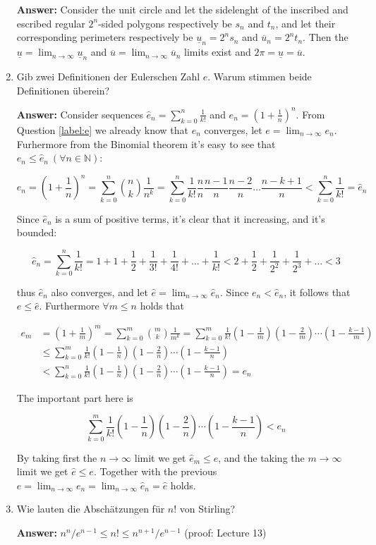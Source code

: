 \documentclass[11pt]{article}
\newcommand{\sumn}[4]{\sum_{#1=#2}^{#3}{#4}}
\newcommand{\NN}[0]{\mathbb{N}}
\newcommand{\slim}[2]{\lim_{#1\to\infty}{#2}}
\begin{document}
\begin{enumerate}
    \textbf{Answer:} Consider the unit circle and let the sidelenght of the inscribed and escribed regular $2^n$-sided polygons respectively be $s_n$ and $t_n$, and let their corresponding perimeters respectively be $\underline{u}_n = 2^n s_n$ and $\overline{u}_n = 2^n t_n$. Then the $\underline{u} = \slim{n}{\underline{u}_n}$ and $\overline{u} = \slim{n}{\overline{u}_n}$ limits exist and $2\pi = \underline{u} = \overline{u}$.
    \item Gib zwei Definitionen der Eulerschen Zahl $e$. Warum stimmen beide Definitionen überein?

    \textbf{Answer:} Consider sequences $\hat{e}_n = \sumn{k}{0}{n}{\frac{1}{k!}}$ and $e_n = \left(1 + \frac{1}{n}\right)^n$.  From Question \ref{label:e} we already know that $e_n$ converges, let $e = \slim{n}{e_n}$. Furhermore from the Binomial theorem it's easy to see that $e_n \le \hat{e}_n~(\forall n\in\NN)$:

    $$e_n = \left(1+\frac{1}{n}\right)^n = \sumn{k}{0}{n}{\binom{n}{k}}\frac{1}{n^k} = \sumn{k}{0}{n}{\frac{1}{k!}\frac{n}{n} \frac{n-1}{n} \frac{n-2}{n} \dots \frac{n-k+1}{n}} < \sumn{k}{0}{n}{\frac{1}{k!}} = \hat{e}_n$$

    Since $\hat{e}_n$ is a sum of positive terms, it's clear that it increasing, and it's bounded:

    $$\hat{e}_n = \sumn{k}{0}{n}{\frac{1}{k!}} = 1 + 1 + \frac{1}{2} + \frac{1}{3!} + \frac{1}{4!} + \dots + \frac{1}{k!} < 2 + \frac{1}{2} + \frac{1}{2^2} + \frac{1}{2^3} + \dots < 3$$

    thus $\hat{e}_n$ also converges, and let $\hat{e} = \slim{n}{\hat{e}_n}$. Since $e_n < \hat{e}_n$, it follows that $e \le \hat{e}$. Furthermore $\forall m \le n$ holds that

    $$\begin{aligned}
        e_m &= \left(1+\frac{1}{m}\right)^m =\sumn{k}{0}{m}{\binom{m}{k}}\frac{1}{m^k} = \sumn{k}{0}{m}{\frac{1}{k!}\left(1 -\frac{1}{m}\right)\left(1 - \frac{2}{m}\right)\cdots\left(1 - \frac{k-1}{m}\right)} \\
        &\le \sumn{k}{0}{m}{\frac{1}{k!}\left(1 -\frac{1}{n}\right)\left(1 - \frac{2}{n}\right)\cdots\left(1 - \frac{k-1}{n}\right)} \\
        &< \sumn{k}{0}{n}{\frac{1}{k!}\left(1 -\frac{1}{n}\right)\left(1 - \frac{2}{n}\right)\cdots\left(1 - \frac{k-1}{n}\right)} = e_n
    \end{aligned}$$

    The important part here is

    $$\sumn{k}{0}{m}{\frac{1}{k!}\left(1 -\frac{1}{n}\right)\left(1 - \frac{2}{n}\right)\cdots\left(1 - \frac{k-1}{n}\right)} < e_n$$

    By taking first the $n\to\infty$ limit we get $\hat{e}_m \le e$, and the taking the $m\to\infty$ limit we get $\hat{e} \le e$. Together with the previous $e = \slim{n}{e_n} = \slim{n}{\hat{e}_n} = \hat{e}$ holds.
    \item Wie lauten die Abschätzungen für $n!$ von Stirling?

    \textbf{Answer:} $n^n/e^{n-1} \le n! \le n^{n+1}/e^{n-1}$ (proof: Lecture 13)
\end{enumerate}
\end{document}
